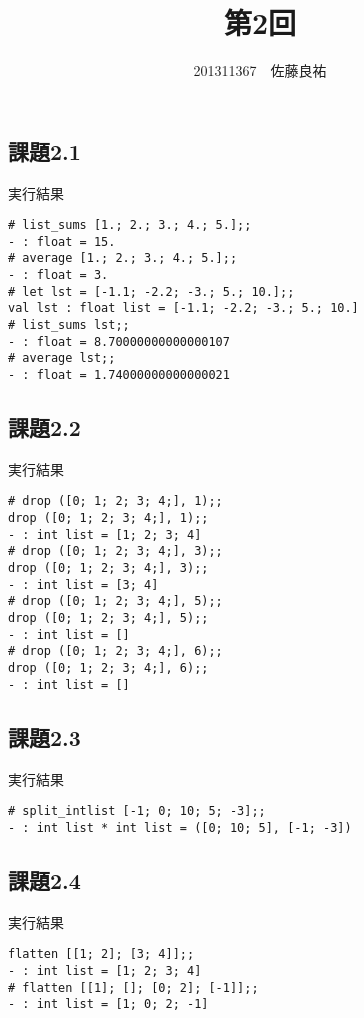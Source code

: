 \documentclass[11pt,a4j]{jarticle}
\title{第2回}
\author{201311367　佐藤良祐}
\begin{document}
\subsection*{課題2.1}

実行結果
\begin{lstlisting}
# list_sums [1.; 2.; 3.; 4.; 5.];;
- : float = 15.
# average [1.; 2.; 3.; 4.; 5.];;
- : float = 3.
# let lst = [-1.1; -2.2; -3.; 5.; 10.];;
val lst : float list = [-1.1; -2.2; -3.; 5.; 10.]
# list_sums lst;;
- : float = 8.70000000000000107
# average lst;;
- : float = 1.74000000000000021
\end{lstlisting}

\subsection*{課題2.2}

\newpage
実行結果
\begin{lstlisting}
# drop ([0; 1; 2; 3; 4;], 1);;
drop ([0; 1; 2; 3; 4;], 1);;
- : int list = [1; 2; 3; 4]
# drop ([0; 1; 2; 3; 4;], 3);;
drop ([0; 1; 2; 3; 4;], 3);;
- : int list = [3; 4]
# drop ([0; 1; 2; 3; 4;], 5);;
drop ([0; 1; 2; 3; 4;], 5);;
- : int list = []
# drop ([0; 1; 2; 3; 4;], 6);;
drop ([0; 1; 2; 3; 4;], 6);;
- : int list = []
\end{lstlisting}

\subsection*{課題2.3}

実行結果
\begin{lstlisting}
# split_intlist [-1; 0; 10; 5; -3];;
- : int list * int list = ([0; 10; 5], [-1; -3])
\end{lstlisting}

\subsection*{課題2.4}

実行結果
\begin{lstlisting}
flatten [[1; 2]; [3; 4]];;
- : int list = [1; 2; 3; 4]
# flatten [[1]; []; [0; 2]; [-1]];;
- : int list = [1; 0; 2; -1]
\end{lstlisting}
\end{document}
